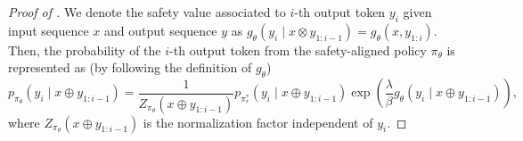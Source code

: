 \begin{proof}[Proof of ]
We denote the safety value associated to $i$-th output token $y_i$ given input sequence $x$ and output sequence $y$ as $g_{\theta}(y_i \mid x\otimes y_{1:i-1}) = g_\theta(x, y_{1:i})$. 
Then, the probability of the $i$-th output token from the safety-aligned policy $\pi_\theta$ is represented as (by following the definition of $g_\theta$)
\begin{equation*}
p_{\pi_\theta}(y_i \mid x \oplus y_{1:i-1}) 
= \frac{1}{Z_{\pi_\theta}(x\oplus y_{1:i-1})} p_{\pi_r^*}(y_i \mid x \oplus y_{1:i-1})  \exp\left( \frac{\lambda}{\beta} g_\theta(y_i \mid x \oplus y_{1:i-1})\right),
\end{equation*}
where $Z_{\pi_\theta}(x\oplus y_{1:i-1})$ is the normalization factor independent of $y_{i}$.


\end{proof}
